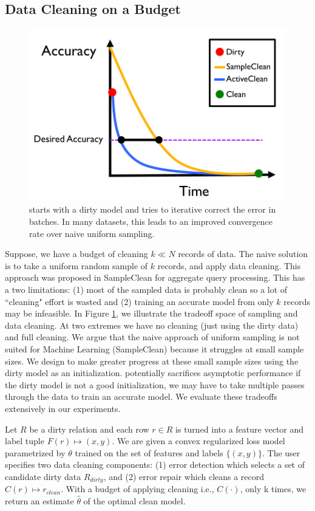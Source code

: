 \subsection{Data Cleaning on a Budget}

\begin{figure}[t]
\centering
 \includegraphics[width=0.6\columnwidth]{figs/arch2.png}
 \caption{\sysfull starts with a dirty model and tries to iterative correct the error in batches. In many datasets, this leads to an improved convergence rate over naive uniform sampling. \label{sys-arch2}}
\end{figure}

Suppose, we have a budget of cleaning $k \ll N$ records of data.
The naive solution is to take a uniform random sample of $k$ records, and apply data cleaning.
This approach was proposed in SampleClean \cite{wang1999sample} for aggregate query processing.
This has a two limitations: (1) most of the sampled data is probably clean so a lot of ``cleaning" effort is wasted and (2) training an accurate model from only $k$ records may be infeasible.
In Figure \ref{sys-arch2}, we illustrate the tradeoff space of sampling and data cleaning.
At two extremes we have no cleaning (just using the dirty data) and full cleaning.
We argue that the naive approach of uniform sampling is not suited for Machine Learning (SampleClean) because it struggles at small sample sizes.
We design \sys to make greater progress at these small sample sizes using the dirty model as an initialization.
\sys potentially sacrifices asymptotic performance if the dirty model is not a good initialization, we may have to take multiple passes through the data to train an accurate model.
We evaluate these tradeoffs extensively in our experiments.

\begin{problem}\label{activeclean}\sloppy
Let $R$ be a dirty relation and each row $r \in R$ is 
turned into a feature vector and label tuple $F(r) \mapsto (x,y)$.
We are given a convex regularized loss model parametrized
by $\theta$ trained on the set of features and labels $\{(x,y)\}$.
The user specifies two data cleaning components: (1) error detection
which selects a set of candidate dirty data $R_{dirty}$, and (2) error 
repair which cleans a record $C(r) \mapsto r_{clean}$.
With a budget of applying cleaning i.e., $C(\cdot)$, only k times, we return an estimate $\hat{\theta}$ of the optimal clean model.
\end{problem}

